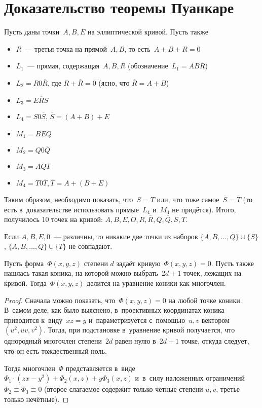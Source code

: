 \documentclass{article}
\begin{document}
\section{Доказательство теоремы Пуанкаре}

Пусть даны точки~$A, B, E$ на эллиптической кривой. Пусть также
\begin{itemize}
  \item $R$~--- третья точка на прямой~$A, B$, то есть~$A + B + R = 0$
  \item $L_1$~--- прямая, содержащая~$A, B, R$ (обозначение~$L_1 = ABR$)
  \item $L_2 = R0\overline{R}$, где $R + \overline{R} = 0$ (ясно, что
    $\overline{R} = A + B$)
  \item $L_3 = E\overline{R}S$
  \item $L_4 = S0\overline{S}$, $\overline{S} = (A + B) + E$
  \item $M_1 = BEQ$
  \item $M_2 = Q0\overline{Q}$
  \item $M_3 = A\overline{Q}T$
  \item $M_4 = T0\overline{T}, \overline{T} = A + (B + E)$
\end{itemize}

Таким образом, необходимо показать, что~$S = T$ или, что тоже
самое~$\overline{S} = \overline{T}$ (то есть в~доказательстве использовать
прямые~$L_4$ и~$M_4$ не придётся). Итого, получилось 10 точек на кривой: $A, B,
E, O, R, \overline{R}, Q, \overline{Q}, S, T$.

\begin{exercise}
  Если $A, B, E, 0$~--- различны, то никакие две точки из наборов
  $\{A, B, \ldots, \overline{Q}\} \cup \{S\}$, $\{A, B, \ldots, \overline{Q}\}
  \cup \{T\}$ не совпадают.
\end{exercise}

\begin{claim}
  \label{con}
  Пусть форма~$\Phi(x, y, z)$ степени $d$ задаёт кривую~$\Phi(x, y, z) = 0$.
  Пусть также нашлась такая коника, на которой можно выбрать~$2d + 1$ точек,
  лежащих на кривой. Тогда~$\Phi(x, y, z)$ делится на уравнение коники как
  многочлен.
\end{claim}
\begin{proof}
  Сначала можно показать, что~$\Phi(x, y, z) = 0$ на любой точке коники. В~самом
  деле, как было выяснено, в~проективных координатах коника приводится
  к~виду~$xz = y$ и~параметризуется с~помощью~$u, v$ вектором~$(u^2, uv, v^2)$.
  Тогда, при подстановке в~уравнение кривой получается, что однородный многочлен
  степени~$2d$ равен нулю в~$2d + 1$ точке, откуда следует, что он есть
  тождественный ноль.

  Тогда многочлен~$\Phi$ представляется в~виде $\Phi_1\cdot(zx - y^2) +
  \Phi_2(x, z) + y\Phi_3(x, z)$ и~в~силу наложенных ограничений~$\Phi_2 \equiv
  \Phi_3 \equiv 0$ (второе слагаемое содержит только чётные степени $u, v$,
  третье только нечётные).
\end{proof}
\end{document}
